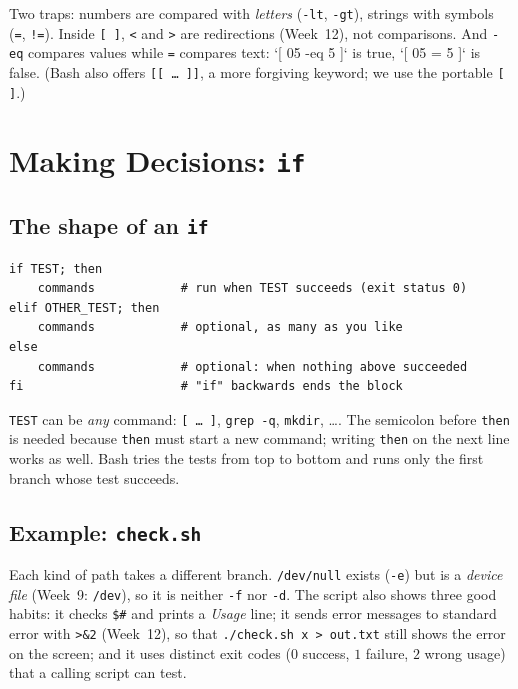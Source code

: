 \documentclass[11pt,a4paper]{article}
\newcommand{\cmd}[1]{\texttt{#1}}
\begin{document}
Two traps: numbers are compared with \emph{letters} (\texttt{-lt}, \texttt{-gt}), strings with symbols (\texttt{=}, \texttt{!=}). Inside \texttt{[ ]}, \texttt{<} and \texttt{>} are redirections (Week~12), not comparisons. And \texttt{-eq} compares values while \texttt{=} compares text: `[ 05 -eq 5 ]` is true, `[ 05 = 5 ]` is false. (Bash also offers \texttt{[[ \ldots\ ]]}, a more forgiving keyword; we use the portable \texttt{[ ]}.)

\section{Making Decisions: \texttt{if}}

\subsection{The shape of an \texttt{if}}

\begin{lstlisting}[style=sh,numbers=none]
if TEST; then
    commands            # run when TEST succeeds (exit status 0)
elif OTHER_TEST; then
    commands            # optional, as many as you like
else
    commands            # optional: when nothing above succeeded
fi                      # "if" backwards ends the block
\end{lstlisting}
\texttt{TEST} can be \emph{any} command: \texttt{[ \ldots\ ]}, \cmd{grep -q}, \cmd{mkdir}, \ldots. The semicolon before \texttt{then} is needed because \texttt{then} must start a new command; writing \texttt{then} on the next line works as well. Bash tries the tests from top to bottom and runs only the first branch whose test succeeds.

\subsection{Example: \texttt{check.sh}}




Each kind of path takes a different branch. \texttt{/dev/null} exists (\texttt{-e}) but is a \emph{device file} (Week~9: \texttt{/dev}), so it is neither \texttt{-f} nor \texttt{-d}. The script also shows three good habits: it checks \texttt{\$\#} and prints a \emph{Usage} line; it sends error messages to standard error with \texttt{>\&2} (Week~12), so that \texttt{./check.sh x > out.txt} still shows the error on the screen; and it uses distinct exit codes ($0$ success, $1$ failure, $2$ wrong usage) that a calling script can test.
\end{document}
